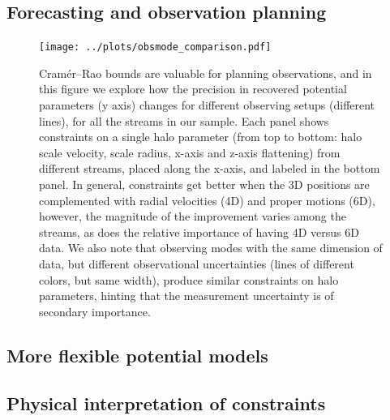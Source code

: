 \documentclass[modern]{aastex61}
\begin{document}
\subsection{Forecasting and observation planning}
\label{sec:forecast}
\begin{figure}
\begin{center}
\texttt{[image: ../plots/obsmode\_comparison.pdf]}
\caption{Cram\'er--Rao bounds are valuable for planning observations, and in this figure we explore how the precision in recovered potential parameters (y axis) changes for different observing setups (different lines), for all the streams in our sample.
Each panel shows constraints on a single halo parameter (from top to bottom: halo scale velocity, scale radius, x-axis and z-axis flattening) from different streams, placed along the x-axis, and labeled in the bottom panel.
In general, constraints get better when the 3D positions are complemented with radial velocities (4D) and proper motions (6D), however, the magnitude of the improvement varies among the streams, as does the relative importance of having 4D versus 6D data.
We also note that observing modes with the same dimension of data, but different observational uncertainties (lines of different colors, but same width), produce similar constraints on halo parameters, hinting that the measurement uncertainty is of secondary importance. 
}
\label{fig:obsmodes}
\end{center}
\end{figure}


\subsection{More flexible potential models}
\label{sec:bfe}
% 


\subsection{Physical interpretation of constraints}
\label{sec:interpretation}
\end{document}
